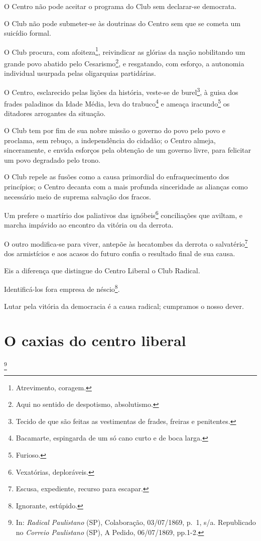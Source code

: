 O Centro não pode aceitar o programa do Club sem declarar-se democrata.

O Club não pode submeter-se às doutrinas do Centro sem que se cometa um
suicídio formal.

O Club procura, com afoiteza\footnote{Atrevimento, coragem.},
reivindicar as glórias da nação nobilitando um grande povo abatido pelo
Cesarismo\footnote{Aqui no sentido de despotismo, absolutismo.}, e
resgatando, com esforço, a autonomia individual usurpada pelas
oligarquias partidárias.

O Centro, esclarecido pelas lições da história, veste-se de
burel\footnote{Tecido de que são feitas as vestimentas de frades,
  freiras e penitentes.}, à guisa dos frades paladinos da Idade Média,
leva do trabuco\footnote{Bacamarte, espingarda de um só cano curto e
  de boca larga.} e ameaça iracundo\footnote{Furioso.} os ditadores
arrogantes da situação.

O Club tem por fim de sua nobre missão o governo do povo pelo povo e
proclama, sem rebuço, a independência do cidadão; o Centro almeja,
sinceramente, e envida esforços pela obtenção de um governo livre, para
felicitar um povo degradado pelo trono.

O Club repele as fusões como a causa primordial do enfraquecimento dos
princípios; o Centro decanta com a mais profunda sinceridade as alianças
como necessário meio de suprema salvação dos fracos.

Um prefere o martírio dos paliativos das ignóbeis\footnote{Vexatórias,
  deploráveis.} conciliações que aviltam, e marcha impávido ao encontro
da vitória ou da derrota.

O outro modifica-se para viver, antepõe às hecatombes da derrota o
salvatério\footnote{Escusa, expediente, recurso para escapar.} dos
armistícios e aos acasos do futuro confia o resultado final de sua
causa.

Eis a diferença que distingue do Centro Liberal o Club Radical.

Identificá-los fora empresa de néscio\footnote{Ignorante, estúpido.}.

Lutar pela vitória da democracia é a causa radical; cumpramos o nosso
dever.

\chapter{O caxias do centro liberal}\footnote{In: \emph{Radical Paulistano}
  (SP), Colaboração, 03/07/1869, p.~1, s/a. Republicado no \emph{Correio
  Paulistano} (SP), A Pedido, 06/07/1869, pp.1-2.}

